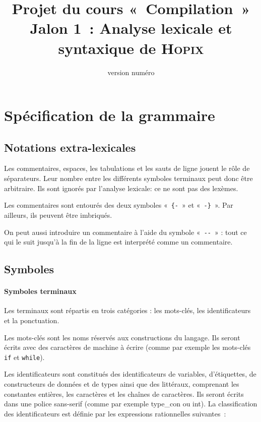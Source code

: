 \documentclass[a4paper,8pt]{article}
\title{
\vspace{-1.5cm}
Projet du cours «~Compilation~» \\
Jalon 1~: Analyse lexicale et syntaxique de \textsc{Hopix}}
\date{\scriptsize version numéro }
\newcommand{\kwd}[1]{\texttt{#1}}
\newcommand{\lex}[1]{\textsf{#1}}
\begin{document}
\maketitle

\section{Spécification de la grammaire}

\subsection{Notations extra-lexicales}

Les commentaires, espaces, les tabulations et les sauts de ligne
jouent le rôle de séparateurs. Leur nombre entre les différents
symboles terminaux peut donc être arbitraire. Ils sont ignorés
par l'analyse lexicale: ce ne sont pas des lexèmes.

Les commentaires sont entourés des deux symboles «~\verb!{-!~» et
«~\verb!-}!~». Par ailleurs, ils peuvent être imbriqués.

On peut aussi introduire un commentaire à l'aide du symbole
«~\verb!--!~» : tout ce qui le suit jusqu'à la fin de la ligne
est interprété comme un commentaire.

\subsection{Symboles}

\paragraph{Symboles terminaux}
Les terminaux sont répartis en trois catégories : les mots-clés, les
identificateurs et la ponctuation.

Les mots-clés sont les noms réservés aux constructions du langage.
Ils seront écrits avec des caractères de machine à écrire
(comme par exemple les mots-clés \kwd{if} et \kwd{while}).

Les identificateurs sont constitués des identificateurs de variables,
d'étiquettes, de constructeurs de données et de types ainsi que des
littéraux, comprenant les constantes entières, les
caractères et les chaînes de caractères.  Ils seront écrits dans une
police \textsf{sans-serif} (comme par exemple \lex{type\_con} ou
\lex{int}). La classification des identificateurs est définie par les
expressions rationnelles suivantes~:
\end{document}
